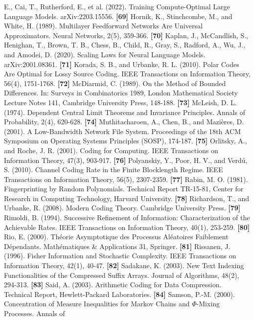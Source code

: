 \documentclass[
]{article}
\begin{document}
E., Cai, T., Rutherford, E., et al. (2022). Training Compute-Optimal
Large Language Models. arXiv:2203.15556.
\textbf{{[}69{]}} Hornik, K., Stinchcombe, M., and White, H. (1989).
Multilayer Feedforward Networks Are Universal Approximators. Neural
Networks, 2(5), 359-366.
\textbf{{[}70{]}} Kaplan, J., McCandlish, S., Henighan, T., Brown,
T. B., Chess, B., Child, R., Gray, S., Radford, A., Wu, J., and
Amodei, D. (2020). Scaling Laws for Neural Language Models.
arXiv:2001.08361.
\textbf{{[}71{]}} Korada, S. B., and Urbanke, R. L. (2010). Polar
Codes Are Optimal for Lossy Source Coding. IEEE Transactions on
Information Theory, 56(4), 1751-1768.
\textbf{{[}72{]}} McDiarmid, C. (1989). On the Method of Bounded
Differences. In: Surveys in Combinatorics 1989, London Mathematical
Society Lecture Notes 141, Cambridge University Press, 148-188.
\textbf{{[}73{]}} McLeish, D. L. (1974). Dependent Central Limit
Theorems and Invariance Principles. Annals of Probability, 2(4),
620-628.
\textbf{{[}74{]}} Muthitacharoen, A., Chen, B., and Mazi\`eres, D.
(2001). A Low-Bandwidth Network File System. Proceedings of the 18th
ACM Symposium on Operating Systems Principles (SOSP), 174-187.
\textbf{{[}75{]}} Orlitsky, A., and Roche, J. R. (2001). Coding for
Computing. IEEE Transactions on Information Theory, 47(3), 903-917.
\textbf{{[}76{]}} Polyanskiy, Y., Poor, H. V., and Verd\'u, S. (2010).
Channel Coding Rate in the Finite Blocklength Regime. IEEE Transactions
on Information Theory, 56(5), 2307-2359.
\textbf{{[}77{]}} Rabin, M. O. (1981). Fingerprinting by Random
Polynomials. Technical Report TR-15-81, Center for Research in Computing
Technology, Harvard University.
\textbf{{[}78{]}} Richardson, T., and Urbanke, R. (2008). Modern Coding
Theory. Cambridge University Press.
\textbf{{[}79{]}} Rimoldi, B. (1994). Successive Refinement of
Information: Characterization of the Achievable Rates. IEEE Transactions
on Information Theory, 40(1), 253-259.
\textbf{{[}80{]}} Rio, E. (2000). Th\'eorie Asymptotique des Processus
Al\'eatoires Faiblement D\'ependants. Math\'ematiques \& Applications 31,
Springer.
\textbf{{[}81{]}} Rissanen, J. (1996). Fisher Information and
Stochastic Complexity. IEEE Transactions on Information Theory, 42(1),
40-47.
\textbf{{[}82{]}} Sadakane, K. (2003). New Text Indexing Functionalities
of the Compressed Suffix Arrays. Journal of Algorithms, 48(2), 294-313.
\textbf{{[}83{]}} Said, A. (2003). Arithmetic Coding for Data
Compression. Technical Report, Hewlett-Packard Laboratories.
\textbf{{[}84{]}} Samson, P.-M. (2000). Concentration of Measure
Inequalities for Markov Chains and $\Phi$-Mixing Processes. Annals of
\end{document}
